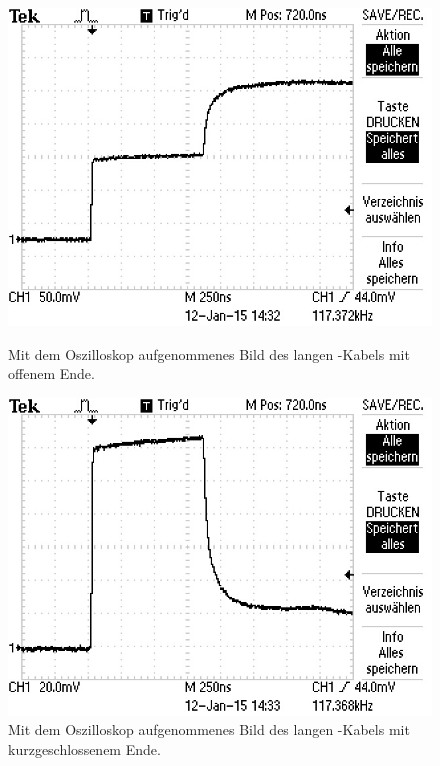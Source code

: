 \begin{figure}[ht]
  \centering
  \includegraphics[scale=1.0]{bilder/reflexion/F0004TEK.JPG}
  \caption{Mit dem Oszilloskop aufgenommenes Bild des langen \CU-Kabels mit
  offenem Ende.}
  \label{fig:oszi_50l_offen}
  \vspace{2em}
  \includegraphics[scale=1.0]{bilder/reflexion/F0005TEK.JPG}
  \caption{Mit dem Oszilloskop aufgenommenes Bild des langen \CU-Kabels mit
  kurzgeschlossenem Ende.}
  \label{fig:oszi_50l_kurz}
\end{figure}


